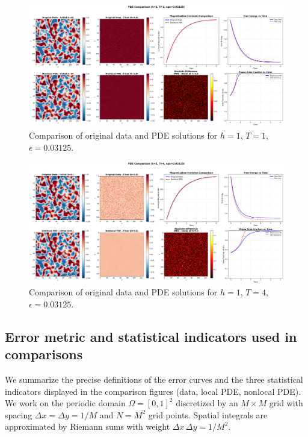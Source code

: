 \documentclass[11pt,a4paper]{article}
\begin{document}
\begin{figure}[!h]
    \centering
    \includegraphics[width=1.0\textwidth]{fig/pde_comparison_h1_T1_eps0.03125.png}
    \caption{Comparison of original data and PDE solutions for $h=1$, $T=1$, $\epsilon=0.03125$.}
    \label{fig:pde_comparison_h1_T1_eps0.03125}
\end{figure}


\begin{figure}[h]
    \centering
    \includegraphics[width=1.0\textwidth]{fig/pde_comparison_h1_T4_eps0.03125.png}
    \caption{Comparison of original data and PDE solutions for $h=1$, $T=4$, $\epsilon=0.03125$.}
    \label{fig:pde_comparison_h1_T4_eps0.03125}
\end{figure}



\subsection{Error metric and statistical indicators used in comparisons}
\label{sec:error_and_stats}

We summarize the precise definitions of the error curves and the three statistical indicators displayed in the comparison figures (data, local PDE, nonlocal PDE). We work on the periodic domain $\Omega=[0,1]^2$ discretized by an $M\times M$ grid with spacing $\Delta x = \Delta y = 1/M$ and $N=M^2$ grid points. Spatial integrals are approximated by Riemann sums with weight $\Delta x\,\Delta y = 1/M^2$.
\end{document}
